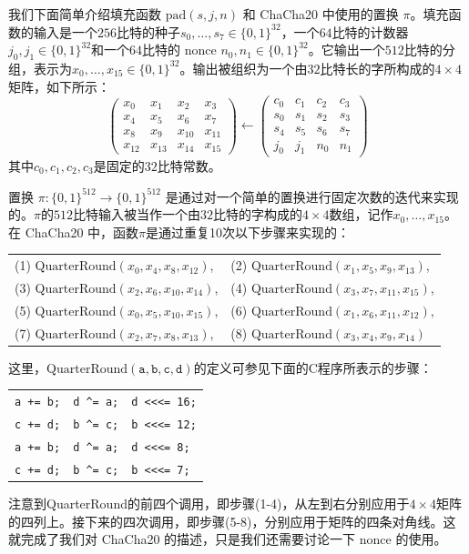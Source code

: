 \begin{snote}[一些细节。]
我们下面简单介绍填充函数 $\mathrm{pad}(s,j,n)$ 和 ChaCha20 中使用的置换 $\pi$。填充函数的输入是一个$256$比特的种子$s_0,\dots,s_7\in\{0,1\}^{32}$，一个$64$比特的计数器$j_0,j_1\in\{0,1\}^{32}$和一个$64$比特的 nonce $n_0,n_1\in\{0,1\}^{32}$。它输出一个$512$比特的分组，表示为$x_0,\dots,x_{15}\in\{0,1\}^{32}$。输出被组织为一个由$32$比特长的字所构成的$4\times4$矩阵，如下所示：
\begin{equation}
\begin{pmatrix}
x_0 & x_1 & x_2 & x_3 \\
x_4 & x_5 & x_6 & x_7 \\
x_8 & x_9 & x_{10} & x_{11} \\
x_{12} & x_{13} & x_{14} & x_{15}
\end{pmatrix}
\longleftarrow
\begin{pmatrix}
c_0 & c_1 & c_2 & c_3 \\
s_0 & s_1 & s_2 & s_3 \\
s_4 & s_5 & s_6 & s_7 \\
j_0 & j_1 & n_0 & n_1
\end{pmatrix}
\end{equation}
其中$c_0,c_1,c_2,c_3$是固定的$32$比特常数。

置换 $\pi:\{0,1\}^{512}\to\{0,1\}^{512}$ 是通过对一个简单的置换进行固定次数的迭代来实现的。$\pi$的$512$比特输入被当作一个由$32$比特的字构成的$4\times4$数组，记作$x_0,\dots,x_{15}$。在 ChaCha20 中，函数$\pi$是通过重复10次以下步骤来实现的：
\begin{center}
\begin{tabular}{ll}
 (1) $\mathrm{QuarterRound}(x_0,x_4,x_8,x_{12})$, & (2) $\mathrm{QuarterRound}(x_1,x_5,x_9,x_{13})$,\\ 
 (3) $\mathrm{QuarterRound}(x_2,x_6,x_{10},x_{14})$, & (4) $\mathrm{QuarterRound}(x_3,x_7,x_{11},x_{15})$,\\  
 (5) $\mathrm{QuarterRound}(x_0,x_5,x_{10},x_{15})$, & (6) $\mathrm{QuarterRound}(x_1,x_6,x_{11},x_{12})$,\\
 (7) $\mathrm{QuarterRound}(x_2,x_7,x_8,x_{13})$, & (8) $\mathrm{QuarterRound}(x_3,x_4,x_9,x_{14})$\\
\end{tabular}
\end{center}
这里，$\mathrm{QuarterRound}(\texttt{a},\texttt{b},\texttt{c},\texttt{d})$的定义可参见下面的C程序所表示的步骤：
\begin{center}
\begin{tabular}{lll}
\texttt{a += b;} & \texttt{d \^{}=  a;} & \texttt{d <<<= 16;}\\
\texttt{c += d;} & \texttt{b \^{}=  c;} & \texttt{b <<<= 12;}\\
\texttt{a += b;} & \texttt{d \^{}=  a;} & \texttt{d <<<= 8;}\\
\texttt{c += d;} & \texttt{b \^{}=  c;} & \texttt{b <<<= 7;}
\end{tabular}
\end{center}
注意到QuarterRound的前四个调用，即步骤(1-4)，从左到右分别应用于$4\times4$矩阵的四列上。接下来的四次调用，即步骤(5-8)，分别应用于矩阵的四条对角线。这就完成了我们对 ChaCha20 的描述，只是我们还需要讨论一下 nonce 的使用。
\end{snote}

